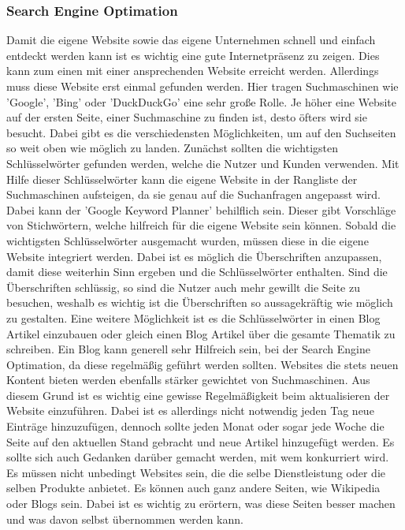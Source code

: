 \subsubsection{Search Engine Optimation}
Damit die eigene Website sowie das eigene Unternehmen schnell und einfach entdeckt werden kann ist es wichtig eine gute Internetpräsenz zu zeigen. Dies kann zum einen mit einer ansprechenden Website erreicht werden. Allerdings muss diese Website erst einmal gefunden werden. 
\newline
Hier tragen Suchmaschinen wie 'Google', 'Bing' oder 'DuckDuckGo' eine sehr große Rolle. Je höher eine Website auf der ersten Seite, einer Suchmaschine zu finden ist, desto öfters wird sie besucht. Dabei gibt es die verschiedensten Möglichkeiten, um auf den Suchseiten so weit oben wie möglich zu landen.
\newline
Zunächst sollten die wichtigsten Schlüsselwörter gefunden werden, welche die Nutzer und Kunden verwenden. Mit Hilfe dieser Schlüsselwörter kann die eigene Website in der Rangliste der Suchmaschinen aufsteigen, da sie genau auf die Suchanfragen angepasst wird. Dabei kann der 'Google Keyword Planner' behilflich sein. Dieser gibt Vorschläge von Stichwörtern, welche hilfreich für die eigene Website sein können. 
\newline
Sobald die wichtigsten Schlüsselwörter ausgemacht wurden, müssen diese in die eigene Website integriert werden. Dabei ist es möglich die Überschriften anzupassen, damit diese weiterhin Sinn ergeben und die Schlüsselwörter enthalten. Sind die Überschriften schlüssig, so sind die Nutzer auch mehr gewillt die Seite zu besuchen, weshalb es wichtig ist die Überschriften so aussagekräftig wie möglich zu gestalten. 
\newline
Eine weitere Möglichkeit ist es die Schlüsselwörter in einen Blog Artikel einzubauen oder gleich einen Blog Artikel über die gesamte Thematik zu schreiben. Ein Blog kann generell sehr Hilfreich sein, bei der Search Engine Optimation, da diese regelmäßig geführt werden sollten. Websites die stets neuen Kontent bieten werden ebenfalls stärker gewichtet von Suchmaschinen. Aus diesem Grund ist es wichtig eine gewisse Regelmäßigkeit beim aktualisieren der Website einzuführen. Dabei ist es allerdings nicht notwendig jeden Tag neue Einträge hinzuzufügen, dennoch sollte jeden Monat oder sogar jede Woche die Seite auf den aktuellen Stand gebracht und neue Artikel hinzugefügt werden.
\newline
Es sollte sich auch Gedanken darüber gemacht werden, mit wem konkurriert wird. Es müssen nicht unbedingt Websites sein, die die selbe Dienstleistung oder die selben Produkte anbietet. Es können auch ganz andere Seiten, wie Wikipedia oder Blogs sein. Dabei ist es wichtig zu erörtern, was diese Seiten besser machen und was davon selbst übernommen werden kann.

